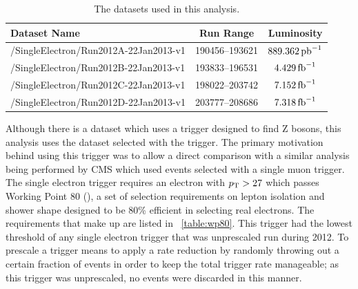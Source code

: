 \begin{table}[h]
\centering
\begin{center}
    \begin{tabular}{ | l | c | c |}
    \hline
    Dataset Name                          & Run Range      & Luminosity       \\ \hline
    /SingleElectron/Run2012A-22Jan2013-v1 & 190456--193621 & $889.362 \mbox{\ensuremath{\,\text{pb}^\text{$-$1}}}$ \\ \hline
    /SingleElectron/Run2012B-22Jan2013-v1 & 193833--196531 & $4.429 \mbox{\ensuremath{\,\text{fb}^\text{$-$1}}}$   \\ \hline
    /SingleElectron/Run2012C-22Jan2013-v1 & 198022--203742 & $7.152 \mbox{\ensuremath{\,\text{fb}^\text{$-$1}}}$   \\ \hline
    /SingleElectron/Run2012D-22Jan2013-v1 & 203777--208686 & $7.318 \mbox{\ensuremath{\,\text{fb}^\text{$-$1}}}$   \\ \hline
    \end{tabular}
\end{center}
\caption{
    The datasets used in this analysis. 
}
\label{table:datasets}
\end{table}

Although there is a \DoubleElectron dataset which uses a trigger designed to
find Z bosons, this analysis uses the \SingleElectron dataset selected with the
\SingleElectronTrigger trigger. The primary motivation behind using this
trigger was to allow a direct comparison with a similar \phistar analysis being
performed by CMS which used \Ztomumu events selected with a single muon
trigger. The single electron trigger requires an electron with $p_{\mathrm{T}} > 27$ which
passes Working Point 80 (\WPEighty), a set of selection requirements on lepton
isolation and shower shape designed to be 80\% efficient in selecting real
electrons. The requirements that make up \WPEighty are listed in
\TAB~\ref{table:wp80}. This trigger had the lowest \pt threshold of any single
electron trigger that was unprescaled run during 2012. To prescale a trigger
means to apply a rate reduction by randomly throwing out a certain fraction of
events in order to keep the total trigger rate manageable; as this trigger was
unprescaled, no events were discarded in this manner.

